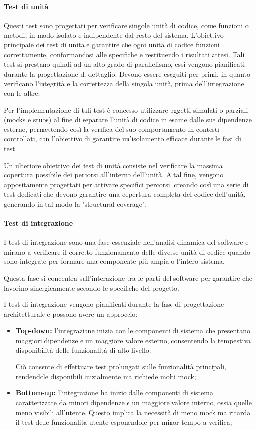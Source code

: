 \paragraph{Test di unità}
Questi test sono progettati per verificare singole unità di codice, come funzioni o metodi, in modo isolato e indipendente dal resto del sistema. L'obiettivo principale dei test di unità è garantire che ogni unità di codice funzioni correttamente, conformandosi alle specifiche e restituendo i risultati attesi.
Tali test si prestano quindi ad un alto grado di parallelismo, essi vengono pianificati durante la progettazione di dettaglio.
Devono essere eseguiti per primi, in quanto verificano l’integrità e la correttezza della singola unità, prima dell’integrazione con le altre.

Per l'implementazione di tali test è concesso utilizzare oggetti simulati o parziali (mocks e stubs) al fine di separare l'unità di codice in esame dalle sue dipendenze esterne, permettendo così la verifica del suo comportamento in contesti controllati, con l'obiettivo di garantire un'isolamento efficace durante le fasi di test.

Un ulteriore obiettivo dei test di unità consiste nel verificare la massima copertura possibile dei percorsi all'interno dell'unità. A tal fine, vengono appositamente progettati per attivare specifici percorsi, creando così una serie di test dedicati che devono garantire una copertura completa del codice dell'unità, generando in tal modo la "structural coverage".

\paragraph{Test di integrazione}
I test di integrazione sono una fase essenziale nell'analisi dinamica del software e mirano a verificare il corretto funzionamento delle diverse unità di codice quando sono integrate per formare una componente più ampia o l'intero sistema.

Questa fase si concentra sull'interazione tra le parti del software per garantire che lavorino sinergicamente secondo le specifiche del progetto.

I test di integrazione vengono pianificati durante la fase di progettazione architetturale e possono avere un approccio:

\begin{itemize}
    \item \textbf{Top-down:}
        l'integrazione inizia con le componenti di sistema che presentano maggiori dipendenze e un maggiore valore esterno, consentendo la tempestiva disponibilità delle funzionalità di alto livello.

        Ciò consente di effettuare test prolungati sulle funzionalità principali, rendendole disponibili inizialmente ma richiede molti mock;
    \item \textbf{Bottom-up:}
        l'integrazione ha inizio dalle componenti di sistema caratterizzate da minori dipendenze e un maggiore valore interno, ossia quelle meno visibili all'utente. Questo implica la necessità di meno mock ma ritarda il test delle funzionalità utente esponendole per minor tempo a verifica;
\end{itemize}

